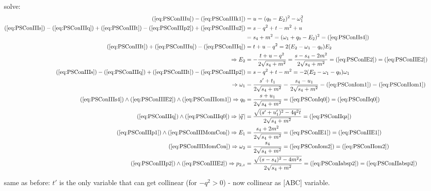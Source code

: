 solve:
\begin{align}
(\ref{eq:PSConIIIu})-(\ref{eq:PSConIIIk1}) &= u=(q_0-E_2)^2-\omega_1^2 \label{eq:PSConIIIu2}\\
(\ref{eq:PSConIIIs}) - (\ref{eq:PSConIIIq}) + (\ref{eq:PSConIIIt}) - (\ref{eq:PSConIIIp2}) + (\ref{eq:PSConIIIu2}) &= s-q^2+t-m^2+u\\
 &= s_4+m^2 = (\omega_1+q_0-E_2)^2 =(\ref{eq:PSConIIs4}) \label{eq:PSConIIIs4}\\
(\ref{eq:PSConIIIt}) + (\ref{eq:PSConIIIu}) - (\ref{eq:PSConIIIq}) &= t+u-q^2 = 2(E_2-\omega_1-q_0)E_2\\
\Rightarrow E_2 &= -\frac{t+u-q^2}{2\sqrt{s_4+m^2}} =\frac{s-s_4-2m^2}{2\sqrt{s_4+m^2}} = (\ref{eq:PSConIE2}) = (\ref{eq:PSConIIE2}) \label{eq:PSConIIIE2}\\
(\ref{eq:PSConIIIs}) - (\ref{eq:PSConIIIq}) + (\ref{eq:PSConIIIt}) - (\ref{eq:PSConIIIp2}) &= s-q^2+t-m^2 = -2(E_2-\omega_1-q_0)\omega_1\\
\Rightarrow \omega_1 &= \frac{s'+t_1}{2\sqrt{s_4+m^2}} =\frac{s_4-u_1}{2\sqrt{s_4+m^2}} = (\ref{eq:PSConIom1}) = (\ref{eq:PSConIIom1})\label{eq:PSConIIIom1}\\
(\ref{eq:PSConIIIs4}) \land (\ref{eq:PSConIIIE2}) \land (\ref{eq:PSConIIIom1}) \Rightarrow q_0 &= \frac{s+u_1}{2\sqrt{s_4+m^2}} = (\ref{eq:PSConIq0}) = (\ref{eq:PSConIIq0}) \label{eq:PSConIIIq0}\\
(\ref{eq:PSConIIIq}) \land (\ref{eq:PSConIIIq0}) \Rightarrow \left|\vec q\,\right| &= \frac{\sqrt{(s'+u_1')^2-4q^2t}}{2\sqrt{s_4+m^2}} =(\ref{eq:PSConIIqz}) \label{eq:PSConIIabsq}\\
(\ref{eq:PSConIIIp1})\land(\ref{eq:PSConIIIMomCon}) \Rightarrow E_1 &= \frac{s_4+2m^2}{2\sqrt{s_4+m^2}} = (\ref{eq:PSConIE1}) = (\ref{eq:PSConIIE1}) \label{eq:PSConIIIE1}\\
(\ref{eq:PSConIIIMomCon}) \Rightarrow \omega_2 &= \frac{s_4}{2\sqrt{s_4+m^2}} = (\ref{eq:PSConIom2}) = (\ref{eq:PSConIIom2}) \label{eq:PSConIIIom2}\\
(\ref{eq:PSConIIIp2}) \land (\ref{eq:PSConIIIE2}) \Rightarrow p_{2,z} &= \frac{\sqrt{(s-s_4)^2-4m^2 s}}{2\sqrt{s_4+m^2}} = (\ref{eq:PSConIabsp2}) = (\ref{eq:PSConIIabsp2}) \label{eq:PSConIIIabsp2}\\
\end{align}


same as before: $t'$ is the only variable that can get collinear (for $-q^2 > 0$) - now collinear as [ABC] variable.

